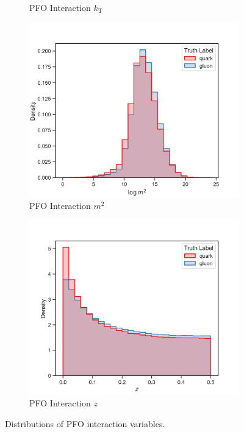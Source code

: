 \begin{figure}[!htb]
\begin{subfigure}[t]{0.45\textwidth}
        \caption{PFO Interaction $k_{\mathrm{T}}$}
        \label{fig:app_pfo_interaction_k_t}
    \end{subfigure}
    \begin{subfigure}[t]{0.45\textwidth}
        \includegraphics[width=\linewidth]{src/plots/distributions/int_PFOs/m2.png}
        \caption{PFO Interaction $m^2$}
        \label{fig:app_pfo_interaction_m2}
    \end{subfigure}
    \begin{subfigure}[t]{0.45\textwidth}
        \includegraphics[width=\linewidth]{src/plots/distributions/int_PFOs/z.png}
        \caption{PFO Interaction $z$}
        \label{fig:app_pfo_interaction_z}
    \end{subfigure}
\caption{Distributions of PFO interaction variables.}
\label{fig:app_pfo_interaction_variables}
\end{figure}
\FloatBarrier
\newpage

